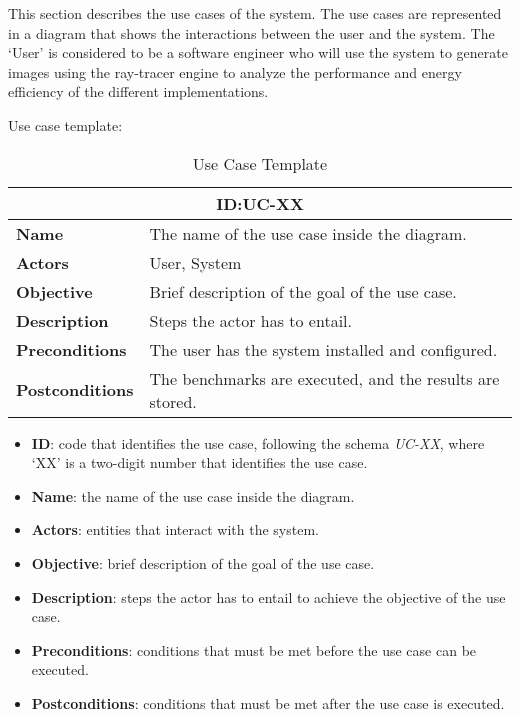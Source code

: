 This section describes the use cases of the system. The use cases are represented in a diagram that shows the interactions between the user and the system. The `User' is considered to be a software engineer who will use the system to generate images using the ray-tracer engine to analyze the performance and energy efficiency of the different implementations.




Use case template:

\begin{table}[H]
    \centering
    \begin{tabular}{l p{10cm}}
        \toprule
        \multicolumn{2}{c}{\textbf{ID:\@ UC-XX}} \\
        \toprule
        \textbf{Name}               &  The name of the use case inside the diagram. \\
        \textbf{Actors}             &  User, System \\
        \textbf{Objective}          &  Brief description of the goal of the use case. \\
        \textbf{Description}        &  Steps the actor has to entail. \\
        \textbf{Preconditions}      &  The user has the system installed and configured. \\
        \textbf{Postconditions}     &  The benchmarks are executed, and the results are stored. \\
    \end{tabular}
    \caption{Use Case Template}\label{tab:uc-xx}
\end{table}

\begin{itemize}
    \item \textbf{ID}: code that identifies the use case, following the schema \textit{UC-XX}, where `XX' is a two-digit number that identifies the use case.
    \item \textbf{Name}: the name of the use case inside the diagram.
    \item \textbf{Actors}: entities that interact with the system.
    \item \textbf{Objective}: brief description of the goal of the use case.
    \item \textbf{Description}: steps the actor has to entail to achieve the objective of the use case.
    \item \textbf{Preconditions}: conditions that must be met before the use case can be executed.
    \item \textbf{Postconditions}: conditions that must be met after the use case is executed.
\end{itemize}

